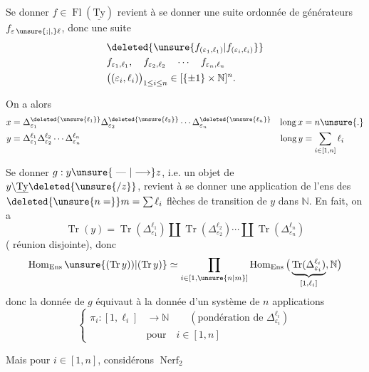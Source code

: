 

Se donner $f\in\operatorname{Fl}(\underline{\mathrm{Ty}})$ revient à se donner une suite ordonnée de générateurs $f_{\varepsilon\,\unsure{;|,}\ell}$, donc une suite
\[
\begin{aligned}
&\deleted{\unsure{f_{(\varepsilon_1,\ell_1)}|f_{(\varepsilon_i,\ell_i)}}}\\
&f_{\varepsilon_1,\ell_1},\quad f_{\varepsilon_2,\ell_2}\quad\cdots\quad f_{\varepsilon_n,\ell_n}\\
&\big((\varepsilon_i,\ell_i)\big)_{1\leq i\leq n}\in[\{\pm1\}\times\mathbb N]^n.
\end{aligned}
\]

On a alors
\[
\begin{aligned}
x&=\Delta_{\varepsilon_1}^{\deleted{\unsure{\ell_1}}}\Delta_{\varepsilon_2}^{\deleted{\unsure{\ell_2}}}\cdots\Delta_{\varepsilon_n}^{\deleted{\unsure{\ell_n}}}&\operatorname{long}x&=n\unsure{.}\\
y&=\Delta_{\varepsilon_1}^{\ell_1}\Delta_{\varepsilon_2}^{\ell_2}\cdots\Delta_{\varepsilon_n}^{\ell_n}&\operatorname{long}y&=\sum_{i\in[1,n]}\ell_i
\end{aligned}
\]

Se donner $g:y\unsure{\text{ --- }|\longrightarrow}z$, i.e. un objet de $y\backslash\underline{\mathrm{Ty}}\deleted{\unsure{/z}}$, revient à se donner une application de l'ens des $\deleted{\unsure{n=}}m=\sum\ell_i$ flèches de transition de $y$ dans $\mathbb N$. En fait, on a
\[
\operatorname{Tr}(y)=\operatorname{Tr}(\Delta_{\varepsilon_1}^{\ell_1})\amalg
\operatorname{Tr}(\Delta_{\varepsilon_2}^{\ell_2})\cdots\amalg\operatorname{Tr}(\Delta_{\varepsilon_n}^{\ell_n})
\]
( réunion disjointe), donc
\[
\operatorname{Hom}_{\mathrm{Ens}}\unsure{(\operatorname{Tr}y))|(\operatorname{Tr}y)}
\simeq\prod_{i\in[1,\unsure{n|m}]}\operatorname{Hom}_{\mathrm{Ens}}
 \big(\underbrace{\operatorname{Tr}(\Delta_{\varepsilon_i}^{\ell_i})}_{[1,\ell_i]},\mathbb N\big)
\]
donc la donnée de $g$ équivaut à la donnée d'un système de $n$ applications
\[
\left\{\begin{aligned}
\pi_i:[1,\ell_i]&\longrightarrow\mathbb N\qquad(\text{pondération de }\Delta_{\varepsilon_i}^{\ell_i})\\
&\text{pour}\quad i\in[1,n]
\end{aligned}\right.
\]

Mais pour $i\in[1,n]$, considérons    $\operatorname{Nerf}_2$
\diagram{\[
\begin{tikzcd}[ampersand replacement=\&,column sep=normal]
\Delta_{\varepsilon_i}\arrow[r,"{f_{\varepsilon_i,\unsure{\ell_i|c_i}}}"] \&
\Delta_{\varepsilon_i}^{\ell_i}\arrow[r,"{g_{\unsure{\varepsilon_i|\deleted{g}},\pi_i}}"] \&
\underbrace{\Delta_{\varepsilon_i}^{\pi_i(1)}\Delta_{\varepsilon_i}^{\pi_i(\unsure{1|2})}\cdots
\Delta_{\varepsilon_i}^{\pi_i(\ell_i)}}_{\Delta_{\varepsilon_i}^{\sum_j\pi_i(j)\,\overset{\mathrm{déf}}{=}\operatorname{long}(\pi_i)}}
\end{tikzcd}
\tag*{(1)}
\]}
